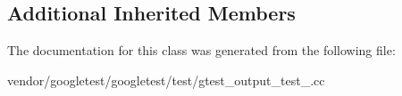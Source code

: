 \subsection*{Additional Inherited Members}


The documentation for this class was generated from the following file\+:\begin{DoxyCompactItemize}
\item 
vendor/googletest/googletest/test/gtest\+\_\+output\+\_\+test\+\_\+.\+cc\end{DoxyCompactItemize}
